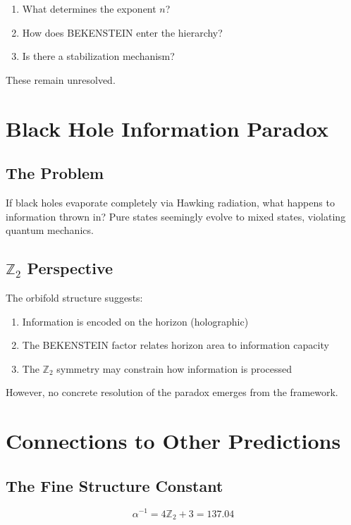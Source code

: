\documentclass[12pt,a4paper]{article}
\begin{document}
\begin{enumerate}
    \item What determines the exponent $n$?
    \item How does BEKENSTEIN enter the hierarchy?
    \item Is there a stabilization mechanism?
\end{enumerate}

These remain unresolved.

\section{Black Hole Information Paradox}

\subsection{The Problem}

If black holes evaporate completely via Hawking radiation, what happens to information thrown in? Pure states seemingly evolve to mixed states, violating quantum mechanics.

\subsection{$\mathbb{Z}_2$ Perspective}

The orbifold structure suggests:
\begin{enumerate}
    \item Information is encoded on the horizon (holographic)
    \item The BEKENSTEIN factor relates horizon area to information capacity
    \item The $\mathbb{Z}_2$ symmetry may constrain how information is processed
\end{enumerate}

However, no concrete resolution of the paradox emerges from the framework.

\section{Connections to Other Predictions}

\subsection{The Fine Structure Constant}

\begin{equation}
\alpha^{-1} = 4\mathbb{Z}_2 + 3 = 137.04
\end{equation}
\end{document}
